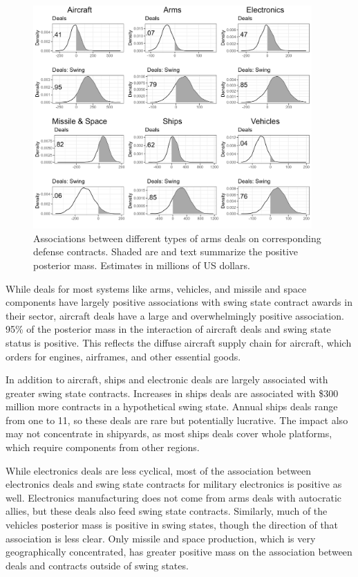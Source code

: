\documentclass[12pt]{article}
\begin{document}
\begin{figure}[htpb]
	\centering
		\includegraphics[width=0.95\textwidth]{../figures/me-deals-sector.png}
	\caption{Associations between different types of arms deals on corresponding defense contracts. Shaded are and text summarize the positive posterior mass. Estimates in millions of US dollars.}
	\label{fig:me-deals-sector}
\end{figure}


While deals for most systems like arms, vehicles, and missile and space components have largely positive associations with swing state contract awards in their sector, aircraft deals have a large and overwhelmingly positive association. 
95\% of the posterior mass in the interaction of aircraft deals and swing state status is positive.
This reflects the diffuse aircraft supply chain for aircraft, which orders for engines, airframes, and other essential goods. 


In addition to aircraft, ships and electronic deals are largely associated with greater swing state contracts. 
Increases in ships deals are associated with \$300 million more contracts in a hypothetical swing state. 
Annual ships deals range from one to 11, so these deals are rare but potentially lucrative. 
The impact also may not concentrate in shipyards, as most ships deals cover whole platforms, which require components from other regions. 

 
While electronics deals are less cyclical, most of the association between electronics deals and swing state contracts for military electronics is positive as well.
Electronics manufacturing does not come from arms deals with autocratic allies, but these deals also feed swing state contracts. 
Similarly, much of the vehicles posterior mass is positive in swing states, though the direction of that association is less clear. 
Only missile and space production, which is very geographically concentrated, has greater positive mass on the association between deals and contracts outside of swing states.
\end{document}
